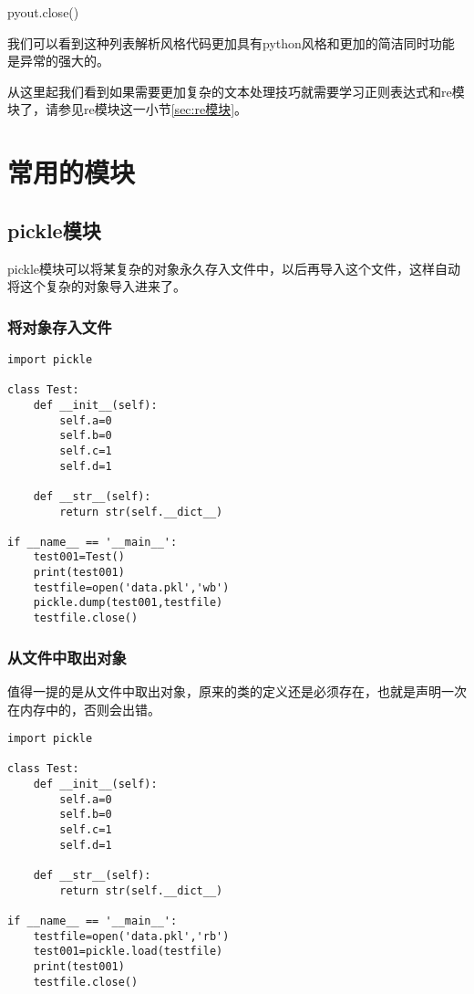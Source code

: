 \documentclass[12pt,oneside]{book}
\begin{document}
\begin{common-format}
\begin{tcbpython}
pyout.close()
\end{tcbpython}

我们可以看到这种列表解析风格代码更加具有python风格和更加的简洁同时功能是异常的强大的。

从这里起我们看到如果需要更加复杂的文本处理技巧就需要学习正则表达式和re模块了，请参见re模块这一小节\ref{sec:re模块}。




\part{常用的模块}
\chapter{pickle模块}
\label{sec:pickle模块}
pickle模块可以将某复杂的对象永久存入文件中，以后再导入这个文件，这样自动将这个复杂的对象导入进来了。

\section{将对象存入文件}
\begin{Verbatim}
import pickle

class Test:
    def __init__(self):
        self.a=0
        self.b=0
        self.c=1
        self.d=1

    def __str__(self):
        return str(self.__dict__)

if __name__ == '__main__':
    test001=Test()
    print(test001)
    testfile=open('data.pkl','wb')
    pickle.dump(test001,testfile)
    testfile.close()
\end{Verbatim}




\section{从文件中取出对象}
值得一提的是从文件中取出对象，原来的类的定义还是必须存在，也就是声明一次在内存中的，否则会出错。
\begin{Verbatim}
import pickle

class Test:
    def __init__(self):
        self.a=0
        self.b=0
        self.c=1
        self.d=1

    def __str__(self):
        return str(self.__dict__)

if __name__ == '__main__':
    testfile=open('data.pkl','rb')
    test001=pickle.load(testfile)
    print(test001)
    testfile.close()
\end{Verbatim}


\end{common-format}
\end{document}
